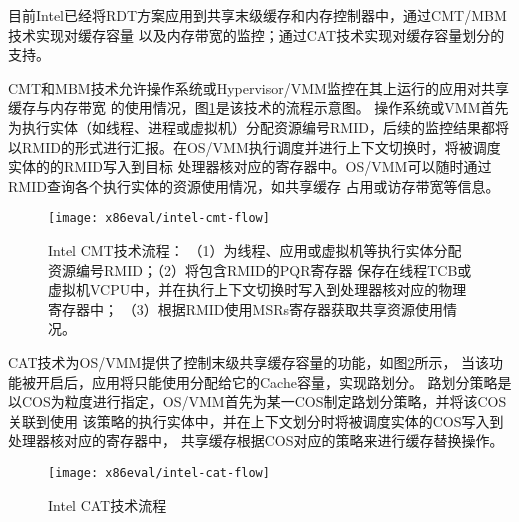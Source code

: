 目前Intel已经将RDT方案应用到共享末级缓存和内存控制器中，通过CMT/MBM技术实现对缓存容量
以及内存带宽的监控；通过CAT技术实现对缓存容量划分的支持。

CMT和MBM技术允许操作系统或Hypervisor/VMM监控在其上运行的应用对共享缓存与内存带宽
的使用情况，图\ref{fig:intel-cmt-flow}是该技术的流程示意图。
操作系统或VMM首先为执行实体（如线程、进程或虚拟机）分配资源编号RMID，后续的监控结果都将
以RMID的形式进行汇报。在OS/VMM执行调度并进行上下文切换时，将被调度实体的的RMID写入到目标
处理器核对应的寄存器中。OS/VMM可以随时通过RMID查询各个执行实体的资源使用情况，如共享缓存
占用或访存带宽等信息。
 
\begin{figure}[H]
  \centering
  \texttt{[image: x86eval/intel-cmt-flow]}
  \caption[Intel Cache Monitor Technology (CMT) 技术流程]{Intel CMT技术流程：
   （1）为线程、应用或虚拟机等执行实体分配资源编号RMID；（2）将包含RMID的PQR寄存器
   保存在线程TCB或虚拟机VCPU中，并在执行上下文切换时写入到处理器核对应的物理寄存器中；
   （3）根据RMID使用MSRs寄存器获取共享资源使用情况。}
  \label{fig:intel-cmt-flow}
\end{figure}

CAT技术为OS/VMM提供了控制末级共享缓存容量的功能，如图\ref{fig:intel-cat-flow}所示，
当该功能被开启后，应用将只能使用分配给它的Cache容量，实现路划分。
路划分策略是以COS为粒度进行指定，OS/VMM首先为某一COS制定路划分策略，并将该COS关联到使用
该策略的执行实体中，并在上下文划分时将被调度实体的COS写入到处理器核对应的寄存器中，
共享缓存根据COS对应的策略来进行缓存替换操作。

\begin{figure}[H]
  \centering
  \texttt{[image: x86eval/intel-cat-flow]}
  \caption[Intel Cache Allocation Technology (CAT) 技术流程]{Intel CAT技术流程}
  \label{fig:intel-cat-flow}
\end{figure}






